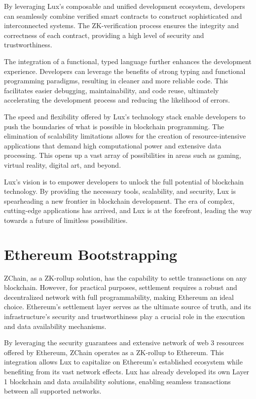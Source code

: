 \documentclass[11pt]{article}
\begin{document}
By leveraging Lux's composable and unified development ecosystem, developers can seamlessly combine verified smart contracts to construct sophisticated and interconnected systems. The ZK-verification process ensures the integrity and correctness of each contract, providing a high level of security and trustworthiness.


The integration of a functional, typed language further enhances the development experience. Developers can leverage the benefits of strong typing and functional programming paradigms, resulting in cleaner and more reliable code. This facilitates easier debugging, maintainability, and code reuse, ultimately accelerating the development process and reducing the likelihood of errors.


The speed and flexibility offered by Lux's technology stack enable developers to push the boundaries of what is possible in blockchain programming. The elimination of scalability limitations allows for the creation of resource-intensive applications that demand high computational power and extensive data processing. This opens up a vast array of possibilities in areas such as gaming, virtual reality, digital art, and beyond.


Lux's vision is to empower developers to unlock the full potential of blockchain technology. By providing the necessary tools, scalability, and security, Lux is spearheading a new frontier in blockchain development. The era of complex, cutting-edge applications has arrived, and Lux is at the forefront, leading the way towards a future of limitless possibilities.


\section{Ethereum Bootstrapping}

ZChain, as a ZK-rollup solution, has the capability to settle transactions on any blockchain. However, for practical purposes, settlement requires a robust and decentralized network with full programmability, making Ethereum an ideal choice. Ethereum's settlement layer serves as the ultimate source of truth, and its infrastructure's security and trustworthiness play a crucial role in the execution and data availability mechanisms.


By leveraging the security guarantees and extensive network of web 3 resources offered by Ethereum, ZChain operates as a ZK-rollup to Ethereum. This integration allows Lux to capitalize on Ethereum's established ecosystem while benefiting from its vast network effects. Lux has already developed its own Layer 1 blockchain and data availability solutions, enabling seamless transactions between all supported networks.
\end{document}
